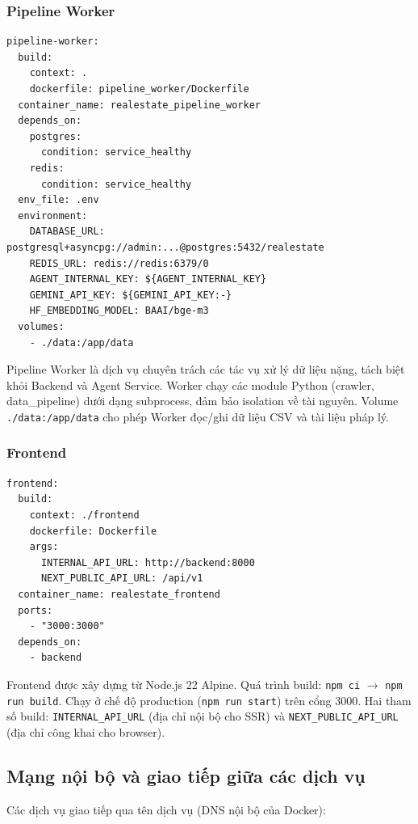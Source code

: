 \subsubsection{Pipeline Worker}

\begin{verbatim}
pipeline-worker:
  build:
    context: .
    dockerfile: pipeline_worker/Dockerfile
  container_name: realestate_pipeline_worker
  depends_on:
    postgres:
      condition: service_healthy
    redis:
      condition: service_healthy
  env_file: .env
  environment:
    DATABASE_URL: postgresql+asyncpg://admin:...@postgres:5432/realestate
    REDIS_URL: redis://redis:6379/0
    AGENT_INTERNAL_KEY: ${AGENT_INTERNAL_KEY}
    GEMINI_API_KEY: ${GEMINI_API_KEY:-}
    HF_EMBEDDING_MODEL: BAAI/bge-m3
  volumes:
    - ./data:/app/data
\end{verbatim}

Pipeline Worker là dịch vụ chuyên trách các tác vụ xử lý dữ liệu nặng, tách biệt khỏi Backend và Agent Service. Worker chạy các module Python (crawler, data\_pipeline) dưới dạng subprocess, đảm bảo isolation về tài nguyên. Volume \texttt{./data:/app/data} cho phép Worker đọc/ghi dữ liệu CSV và tài liệu pháp lý.

\subsubsection{Frontend}

\begin{verbatim}
frontend:
  build:
    context: ./frontend
    dockerfile: Dockerfile
    args:
      INTERNAL_API_URL: http://backend:8000
      NEXT_PUBLIC_API_URL: /api/v1
  container_name: realestate_frontend
  ports:
    - "3000:3000"
  depends_on:
    - backend
\end{verbatim}

Frontend được xây dựng từ Node.js 22 Alpine. Quá trình build: \texttt{npm ci} $\rightarrow$ \texttt{npm run build}. Chạy ở chế độ production (\texttt{npm run start}) trên cổng 3000. Hai tham số build: \texttt{INTERNAL\_API\_URL} (địa chỉ nội bộ cho SSR) và \texttt{NEXT\_PUBLIC\_API\_URL} (địa chỉ công khai cho browser).

\subsection{Mạng nội bộ và giao tiếp giữa các dịch vụ}

Các dịch vụ giao tiếp qua tên dịch vụ (DNS nội bộ của Docker):

